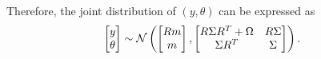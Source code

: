 \documentclass[letter, 10pt]{article}
\begin{document}
%
%
Therefore, the joint distribution of $(y, \theta)$ can be expressed as
%
%
\begin{align*}
  \begin{bmatrix}
    y \\ \theta
  \end{bmatrix}
  &\sim
    \mathcal{N} 
    \left(
    \begin{bmatrix}
      Rm \\ m
    \end{bmatrix} ,
  \begin{bmatrix}
      R \Sigma R^T + \Omega & R\Sigma \\
      \Sigma R^T & \Sigma
    \end{bmatrix}
    \right).
\end{align*}

\end{document}
